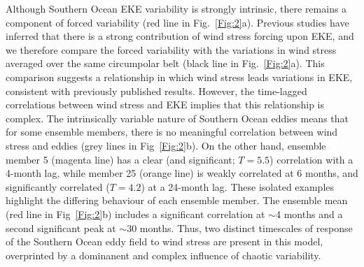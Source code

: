 \documentclass[linenumbers]{agujournal2019}
\begin{document}
Although Southern Ocean EKE variability is strongly intrinsic, there remains a component of forced variability (red line in Fig.~\ref{Fig:2}a).
Previous studies have inferred that there is a strong contribution of wind stress forcing upon EKE, and we therefore compare the forced variability with the variations in wind stress averaged over the same circumpolar belt (black line in Fig.~\ref{Fig:2}a).
This comparison suggests a relationship in which wind stress leads variations in EKE, consistent with previously published results.
However, the time-lagged correlations between wind stress and EKE implies that this relationship is complex. 
The intrinsically variable nature of Southern Ocean eddies means that for some ensemble members, there is no meaningful correlation between wind stress and eddies (grey lines in Fig~\ref{Fig:2}b).
On the other hand, ensemble member 5 (magenta line) has a clear (and significant; $T = 5.5$) correlation with a 4-month lag, while member 25 (orange line) is weakly correlated at 6 months, and significantly correlated ($T = 4.2$) at a 24-month lag.
These isolated examples highlight the differing behaviour of each ensemble member. 
The ensemble mean (red line in Fig~\ref{Fig:2}b) includes a significant correlation at $\sim$4 months and a second significant peak at $\sim$30 months.
Thus, two distinct timescales of response of the Southern Ocean eddy field to wind stress are present in this model, overprinted by a dominanent and complex influence of chaotic variability. 
\end{document}
